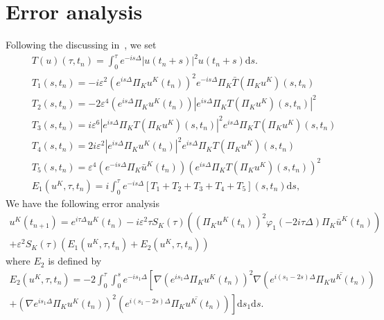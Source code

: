 \documentclass[10pt,a4paper]{article}
\begin{document}
  \section{Error analysis}
  Following the discussing in~\cite{OsRoSc21}, we set
  \begin{align}
    \label{TOp}& T(u)(\tau,t_n) = \int_0^{\tau} e^{-is\Delta} |u(t_n+s)|^2 u(t_n+s) \mathrm{d} s.\\
    \label{T1} & T_1(s, t_n) = -i\varepsilon^2 \left(e^{i s \Delta} \Pi_K u^K\left(t_n\right)\right)^2 e^{-i s \Delta} \Pi_K \bar{T}\left(\Pi_K u^K\right)\left(s, t_n\right) \\
    \label{T2} & T_2(s, t_n) = -2\varepsilon^4 \left(e^{i s \Delta} \Pi_K u^K\left(t_n\right)\right)\left|e^{i s \Delta} \Pi_K T\left(\Pi_K u^K\right)\left(s, t_n\right)\right|^2 \\
    \label{T3} & T_3(s, t_n) = i\varepsilon^6 \left|e^{i s \Delta} \Pi_K T\left(\Pi_K u^K\right)\left(s, t_n\right)\right|^2 e^{i s \Delta} \Pi_K T\left(\Pi_K u^K\right)\left(s, t_n\right) \\
    \label{T4} & T_4(s, t_n) = 2i\varepsilon^2 \left|e^{i s \Delta} \Pi_K u^K\left(t_n\right)\right|^2 e^{i s \Delta} \Pi_K T\left(\Pi_K u^K\right)\left(s, t_n\right) \\
    \label{T5} & T_5(s, t_n) = \varepsilon^4 \left(e^{-i s \Delta} \Pi_K \bar{u}^K\left(t_n\right)\right)\left(e^{i s \Delta} \Pi_K T\left(\Pi_K u^K\right)\left(s, t_n\right)\right)^2 \\
    \label{E1} & E_1(u^K, \tau, t_n) = i \int_0^{\tau} e^{-is\Delta} 
    [T_1 + T_2 + T_3 + T_4 + T_5](s, t_n) \mathrm{d} s,
  \end{align}
  We have the following error analysis
  \begin{multline}
    u^K(t_{n+1}) = e^{i\tau\Delta}u^K(t_n) 
    - i\varepsilon^2\tau S_K(\tau) \left( \left(\Pi_K u^K(t_n)\right)^2 
    \varphi_1(-2i\tau\Delta)\Pi_K \bar{u}^K(t_n) \right) \\
    + \varepsilon^2 S_K(\tau) \left( E_1(u^K, \tau, t_n) + E_2(u^K, \tau, t_n) 
    \right)
  \end{multline}
  where \(E_2\) is defined by 
  \begin{multline}\label{E2}
    E_2(u^K, \tau, t_n) = -2 \int_0^{\tau} \int_0^s e^{-is_1\Delta} \left[
    \nabla \left(e^{is_1\Delta}\Pi_K u^K(t_n)\right)^2 
    \nabla \left(e^{i(s_1-2s)\Delta}\overline{\Pi_K u^K(t_n)}\right)\right. \\
    \left.+ \left( \nabla e^{is_1\Delta}\Pi_K u^K(t_n) \right)^2 
    \left( e^{i(s_1-2s)\Delta}\overline{\Pi_K u^K(t_n)} \right) 
    \right] \mathrm{d}s_1\mathrm{d}s .
  \end{multline}
  
\end{document}
